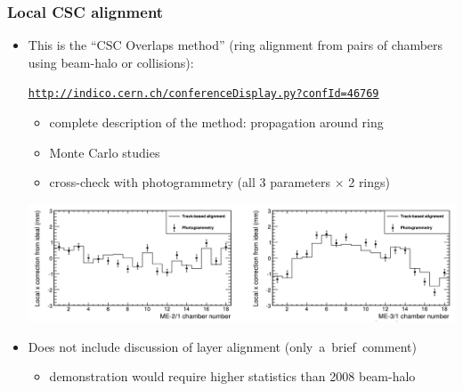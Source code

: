 \documentclass[compress]{beamer}
\begin{document}
\begin{frame}
\frametitle{Local CSC alignment}

\begin{itemize}
\item This is the ``CSC Overlaps method'' (ring alignment from pairs of chambers using beam-halo or collisions):

\textcolor{blue}{\tt \tiny \underline{\href{http://indico.cern.ch/conferenceDisplay.py?confId=46769}{http://indico.cern.ch/conferenceDisplay.py?confId=46769}}}

\begin{itemize}
\item complete description of the method: propagation around ring
\item Monte Carlo studies
\item cross-check with photogrammetry (all 3 parameters $\times$ 2 rings)
\end{itemize}

\includegraphics[width=\linewidth]{csclocal.png}

\item Does not include discussion of layer alignment \mbox{(only a brief comment)\hspace{-1 cm}}
\begin{itemize}
\item demonstration would require higher statistics than 2008 beam-halo
\end{itemize}
\end{itemize}
\end{frame}
\end{document}
